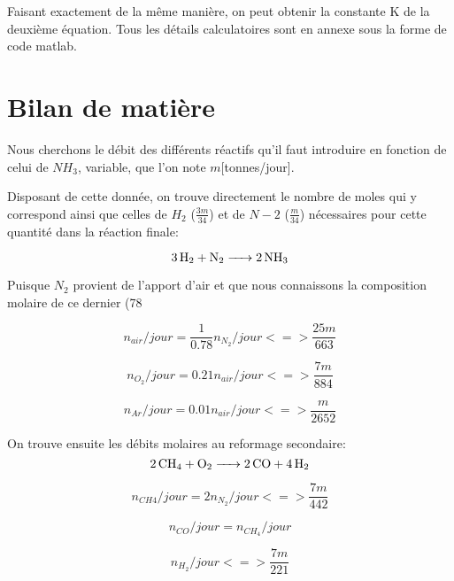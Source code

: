 \documentclass[a4paper, oneside, 12pt]{article}
\begin{document}
Faisant exactement de la même manière, on peut obtenir la constante K de la deuxième équation. Tous les détails calculatoires sont en annexe sous la forme de code matlab.

\section{Bilan de matière}

Nous cherchons le débit des différents réactifs qu'il faut introduire en fonction de celui de $NH_3$, variable, que l'on note $m$[tonnes/jour].

Disposant de cette donnée, on trouve directement le nombre de moles qui y correspond ainsi que celles de $H_2$ ($\frac{3m}{34}$) et de $N-2$ ($\frac{m}{34}$) nécessaires  pour cette quantité dans la réaction finale:

\begin{equation*}
	\ce{3H2 + N2 -> 2NH3}
\end{equation*}

Puisque $N_2$ provient de l'apport d'air et que nous connaissons la composition molaire de ce dernier (78%

\begin{equation}
	n_{air}/jour=\frac{1}{0.78} n_{N_2}/jour <=> \frac{25 m}{663}
\end{equation}

\begin{equation}
	n_{O_2}/jour=0.21 n_{air}/jour <=> \frac{7 m}{884}
\end{equation}

\begin{equation}
	n_{Ar}/jour=0.01 n_{air}/jour <=> \frac{m}{2652}
\end{equation}

On trouve ensuite les débits molaires au reformage secondaire:
\begin{equation*}
	\ce{2CH4 + O2 -> 2CO + 4H2}
\end{equation*}

\begin{equation}
	n_{CH4}/jour=2 n_{N_2}/jour <=> \frac{7 m}{442}
\end{equation}

\begin{equation}
	n_{CO}/jour=n_{CH_4}/jour
\end{equation}

\begin{equation}
	n_{H_2}/jour <=> \frac{7m}{221}
\end{equation}
\end{document}
